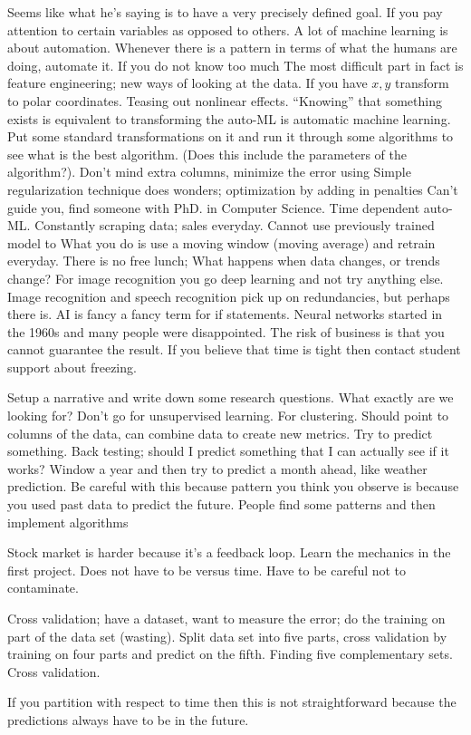 Seems like what he's saying is to have a very
precisely defined goal.
If you pay attention to certain variables as opposed
to others. A lot of machine learning is about automation.
Whenever there is a pattern in terms of what the humans are
doing, automate it. If you do not know too much
The most difficult part in fact is feature engineering;
new ways of looking at the data. If you have $x,y$
transform to polar coordinates. Teasing out nonlinear
effects. ``Knowing'' that something exists is equivalent
to transforming the
auto-ML is automatic machine learning. Put some standard
transformations on it and run it through some algorithms to
see what is the best algorithm. (Does this include the parameters
of the algorithm?). Don't mind extra columns, minimize the error
using
Simple regularization technique does wonders; optimization
by adding in penalties
Can't guide you, find someone with PhD. in Computer Science.
Time dependent auto-ML.
Constantly scraping data; sales everyday. Cannot use previously
trained model to
What you do is use a moving window (moving average) and retrain
everyday.
There is no free lunch; What happens when data changes, or trends
change?
For image recognition you go deep learning and not
try anything else. Image recognition and speech recognition
pick up on redundancies, but perhaps there is. AI is fancy
a fancy term for if statements.
Neural networks started in the 1960s and many people were disappointed.
The risk of business is that you cannot guarantee the result.
If you believe that time is tight then contact student support
about freezing.

Setup a narrative and write down some research questions.
What exactly are we looking for?
Don't go for unsupervised learning. For clustering.
Should point to columns
of the data, can combine data to create new metrics.
Try to predict something. Back testing; should I predict
something that I can actually see if it works? Window
a year and then try to predict a month ahead, like weather prediction.
Be careful with this because pattern you think you observe is because
you used past data to predict the future. People find some patterns
and then  implement algorithms

Stock market is harder because it's a feedback loop.
Learn the mechanics in the first project. Does not have to be versus
time. Have to be careful not to contaminate.

Cross validation; have a dataset, want to measure the error; do the training
on part of the data set (wasting). Split data set into five parts, cross
validation by training on four parts and predict on the fifth. Finding
five complementary sets. Cross validation.

If you partition with respect to time then this is not straightforward
because the predictions always have to be in the future. 